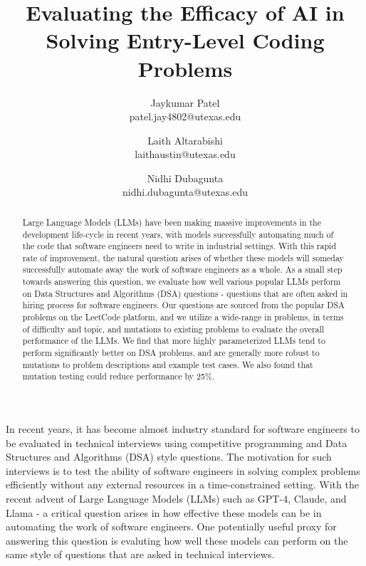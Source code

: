 \documentclass[times, 10pt,twocolumn]{article}
\begin{document}
\title{Evaluating the Efficacy of AI in Solving Entry-Level Coding Problems}

\author{Jaykumar Patel\\
patel.jay4802@utexas.edu\\
\and
Laith Altarabishi\\
laithaustin@utexas.edu\\
\and
Nidhi Dubagunta\\
nidhi.dubagunta@utexas.edu\\
}

\maketitle
\thispagestyle{empty}

\begin{abstract}
Large Language Models (LLMs) have been making massive improvements in the development life-cycle in recent years, with models successfully automating much of the code that software engineers need to write in industrial settings. With this rapid rate of improvement, the natural question arises of whether these models will someday successfully automate away the work of software engineers as a whole. As a small step towards answering this question, we evaluate how well various popular LLMs perform on Data Structures and Algorithms (DSA) questions - questions that are often asked in hiring process for software engineers. Our questions are sourced from the popular DSA problems on the LeetCode platform, and we utilize a wide-range in problems, in terms of difficulty and topic, and mutations to existing problems to evaluate the overall performance of the LLMs. We find that more highly parameterized LLMs tend to perform significantly better on DSA problems, and are generally more robust to mutations to problem descriptions and example test cases. We also found that mutation testing could reduce performance by 25\%.
\end{abstract}


In recent years, it has become almost industry standard for software engineers to be evaluated in technical interviews using competitive programming and Data Structures and Algorithms (DSA) style questions. The motivation for such interviews is to test the ability of software engineers in solving complex problems efficiently without any external resources in a time-constrained setting. With the recent advent of Large Language Models (LLMs) such as GPT-4, Claude, and Llama - a critical question arises in how effective these models can be in automating the work of software engineers. One potentially useful proxy for answering this question is evaluting how well these models can perform on the same style of questions that are asked in technical interviews.
\end{document}

